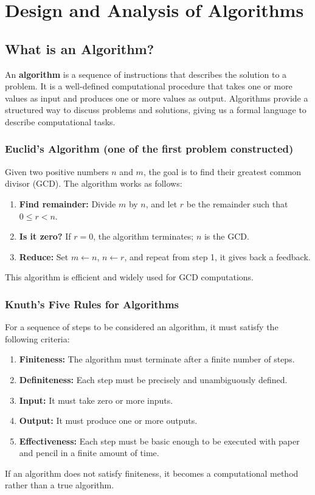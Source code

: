 \chapter{Design and Analysis of Algorithms}
    \section{What is an Algorithm?}
    An \textbf{algorithm} is a sequence of instructions that describes the solution to a problem. It is a well-defined computational procedure that takes one or more values as input and produces one or more values as output. Algorithms provide a structured way to discuss problems and solutions, giving us a formal language to describe computational tasks.
    
    \subsection{Euclid's Algorithm (one of the first problem constructed)}
    Given two positive numbers \(n\) and \(m\), the goal is to find their greatest common divisor (GCD). The algorithm works as follows:
    \begin{enumerate}
        \item \textbf{Find remainder:} Divide \(m\) by \(n\), and let \(r\) be the remainder such that \(0 \leq r < n\).
        \item \textbf{Is it zero?} If \(r = 0\), the algorithm terminates; \(n\) is the GCD.
        \item \textbf{Reduce:} Set \(m \leftarrow n\), \(n \leftarrow r\), and repeat from step 1, it gives back a feedback.
    \end{enumerate}
    This algorithm is efficient and widely used for GCD computations. 
    
    \subsection{Knuth's Five Rules for Algorithms}
    For a sequence of steps to be considered an algorithm, it must satisfy the following criteria:
    \begin{enumerate}
        \item \textbf{Finiteness:} The algorithm must terminate after a finite number of steps.
        \item \textbf{Definiteness:} Each step must be precisely and unambiguously defined.
        \item \textbf{Input:} It must take zero or more inputs.
        \item \textbf{Output:} It must produce one or more outputs.
        \item \textbf{Effectiveness:} Each step must be basic enough to be executed with paper and pencil in a finite amount of time.
    \end{enumerate}
    If an algorithm does not satisfy finiteness, it becomes a computational method rather than a true algorithm.
    
